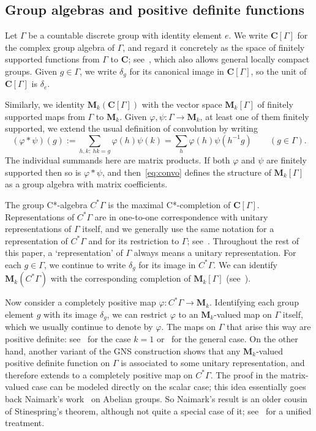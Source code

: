 \documentclass[12pt,a4paper]{article}
\numberwithin{equation}{section}
\theoremstyle{remark}
\newcommand{\bbC}{\mathbf{C}}
\newcommand{\rmM}{\mathbf{M}}
\newcommand{\G}{\Gamma}
\renewcommand{\phi}{\varphi}
\begin{document}
\subsection{Group algebras and positive definite functions}\label{subs:group-alg}

Let $\G$ be a countable discrete group with identity element $e$. We write $\bbC[\G]$ for the complex group algebra of $\G$, and regard it concretely as the space of finitely supported functions from $\G$ to $\bbC$; see~\cite[Chap. 13]{Dix--Cstar}, which also allows general locally compact groups.  Given $g \in \G$, we write $\delta_g$ for its canonical image in $\bbC[\G]$, so the unit of $\bbC[\G]$ is $\delta_e$.

Similarly, we identity $\rmM_k(\bbC[\G])$ with the vector space $\rmM_k[\G]$ of finitely supported maps from $\G$ to $\rmM_k$.  Given $\phi,\psi:\G\to \rmM_k$, at least one of them finitely supported, we extend the usual definition of convolution by writing
\begin{equation}\label{eq:convo}
(\phi\ast \psi)(g) := \sum_{h,k:\ hk=g}\phi(h)\psi(k) = \sum_h \phi(h)\psi(h^{-1}g) \qquad (g \in \G).
\end{equation}
The individual summands here are matrix products.  If both $\phi$ and $\psi$ are finitely supported then so is $\phi\ast \psi$, and then~\eqref{eq:convo} defines the structure of $\rmM_k[\G]$ as a group algebra with matrix coefficients.

The group C*-algebra $C^\ast \G$ is the maximal C*-completion of $\bbC[\G]$.  Representations of $C^\ast \G$ are in one-to-one correspondence with unitary representations of $\G$ itself, and we generally use the same notation for a representation of $C^\ast\G$ and for its restriction to $\G$; see~\cite[Sec. 13.9]{Dix--Cstar}.  Throughout the rest of this paper, a `representation' of $\G$ always means a unitary representation. For each $g \in \G$, we continue to write $\delta_g$ for its image in $C^\ast \G$.  We can identify $\rmM_k(C^\ast \G)$ with the corresponding completion of $\rmM_k[\G]$ (see~\cite[Lem. 10]{Oza13}).

Now consider a completely positive map $\phi:C^\ast \G\to \rmM_k$. Identifying each group element $g$ with its image $\delta_g$, we can restrict $\phi$ to an $\rmM_k$-valued map on $\G$ itself, which we usually continue to denote by $\phi$.  The maps on $\G$ that arise this way are positive definite: see~\cite[Sec. 13.4]{Dix--Cstar} for the case $k=1$ or~\cite[App. D]{BroOza08} for the general case.  On the other hand, another variant of the GNS construction shows that any $\rmM_k$-valued positive definite function on $\G$ is associated to some unitary representation, and therefore extends to a completely positive map on $C^\ast\G$.  The proof in the matrix-valued case can be modeled directly on the scalar case; this idea essentially goes back Naimark's work~\cite{Nai43} on Abelian groups.  So Naimark's result is an older cousin of Stinespring's theorem, although not quite a special case of it; see~\cite[Thm. 12 and Cor. 13]{Oza13} for a unified treatment. %
\end{document}
